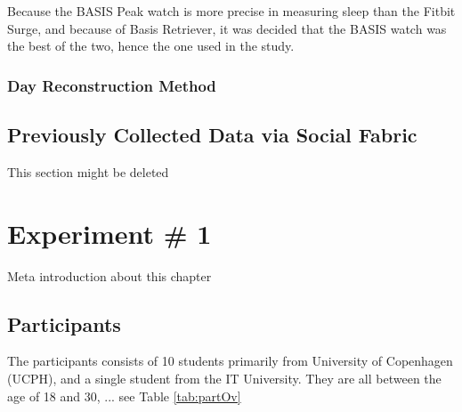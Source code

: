 \documentclass[12pt]{article} %
\begin{document}
Because the BASIS Peak watch is more precise in measuring sleep than the Fitbit Surge, and because of Basis Retriever, it was decided that the BASIS watch was the best of the two, hence the one used in the study. 

\subsubsection{Day Reconstruction Method}

\subsection{Previously Collected Data via Social Fabric}
This section might be deleted

	
\section{Experiment \# 1}
\label{sec:experiment1}
Meta introduction about this chapter

\subsection{Participants} \label{sec:participants}
The participants consists of 10 students primarily from University of Copenhagen (UCPH), and a single student from the IT University. They are all between the age of 18 and 30, ... see Table \ref{tab:partOv}\\

\end{document}
